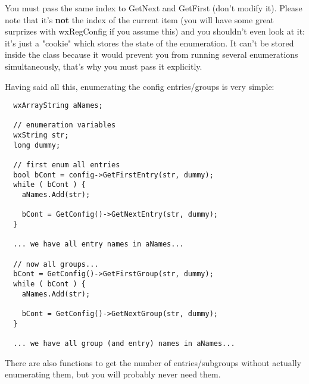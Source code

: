 You must pass the same index to GetNext and GetFirst (don't modify it).
Please note that it's {\bf not} the index of the current item (you will have
some great surprizes with wxRegConfig if you assume this) and you shouldn't
even look at it: it's just a "cookie" which stores the state of the
enumeration. It can't be stored inside the class because it would prevent you
from running several enumerations simultaneously, that's why you must pass it
explicitly.

Having said all this, enumerating the config entries/groups is very simple:

\begin{verbatim}
  wxArrayString aNames;

  // enumeration variables
  wxString str;
  long dummy;

  // first enum all entries
  bool bCont = config->GetFirstEntry(str, dummy);
  while ( bCont ) {
    aNames.Add(str);

    bCont = GetConfig()->GetNextEntry(str, dummy);
  }

  ... we have all entry names in aNames...

  // now all groups...
  bCont = GetConfig()->GetFirstGroup(str, dummy);
  while ( bCont ) {
    aNames.Add(str);

    bCont = GetConfig()->GetNextGroup(str, dummy);
  }

  ... we have all group (and entry) names in aNames...

\end{verbatim}

There are also functions to get the number of entries/subgroups without
actually enumerating them, but you will probably never need them.

\\
\\
\\
\\
\\


\\
\\

